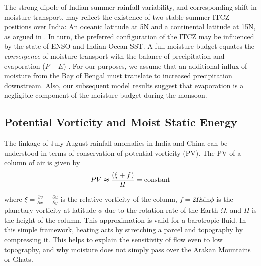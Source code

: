 	The strong dipole of Indian summer rainfall variability, and corresponding shift in moisture transport, may reflect the existence of two stable summer ITCZ positions over India: An oceanic latitude at 5\textdegree N and a continental latitude at 15\textdegree N, as argued in \cite{Gadgil2003}. In turn, the preferred configuration of the ITCZ may be influenced by the state of ENSO and Indian Ocean SST. A full moisture budget equates the \textit{convergence} of moisture transport with the balance of precipitation and evaporation ($P-E$) \citep{Trenberth1991,Chen2014b}. For our purposes, we assume that an additional influx of moisture from the Bay of Bengal must translate to increased precipitation downstream. Also, our subsequent model results suggest that evaporation is a negligible component of the moisture budget during the monsoon.
		
\subsection{Potential Vorticity and Moist Static Energy}

	The linkage of July-August rainfall anomalies in India and China can be understood in terms of conservation of potential vorticity (PV). The PV of a column of air is given by
	\begin{displaymath}
			PV  \thickapprox \frac{\left(\xi+f\right)}{H}  = \mathrm{ constant}
	\end{displaymath}
	
	where $\xi = \frac{\partial v}{\partial x}-\frac{\partial u}{\partial y}$ is the relative vorticity of the column, $f=2\Omega\mathrm{sin}\phi$ is the planetary vorticity at latitude $\phi$ due to the rotation rate of the Earth $\Omega$, and $H$ is the height of the column. This approximation is valid for a barotropic fluid. In this simple framework, heating acts by stretching a parcel and topography by compressing it. This helps to explain the sensitivity of flow even to low topography, and why moisture does not simply pass over the Arakan Mountains or Ghats.
	
